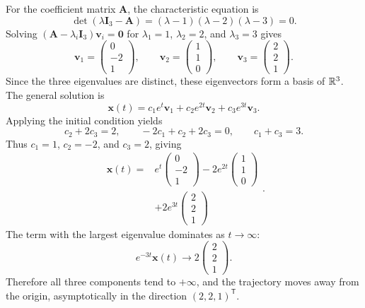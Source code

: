 \documentclass[11pt,oneside]{article}
\begin{document}
\begin{solution}
For the coefficient matrix $\mathbf{A}$, the characteristic equation is
\[
    \det(\lambda\mathbf{I}_3-\mathbf{A})
    =(\lambda-1)(\lambda-2)(\lambda-3)=0.
\]
Solving $(\mathbf{A}-\lambda_i\mathbf{I}_3)\mathbf{v}_i=\mathbf{0}$ for $\lambda_1=1$, $\lambda_2=2$, and $\lambda_3=3$ gives
\[
    \mathbf{v}_1=\begin{pmatrix}0\\-2\\1\end{pmatrix},
    \qquad
    \mathbf{v}_2=\begin{pmatrix}1\\1\\0\end{pmatrix},
    \qquad
    \mathbf{v}_3=\begin{pmatrix}2\\2\\1\end{pmatrix}.
\]
Since the three eigenvalues are distinct, these eigenvectors form a basis of $\mathbb{R}^3$. The general solution is
\[
    \mathbf{x}(t)
    =c_1e^t\mathbf{v}_1+c_2e^{2t}\mathbf{v}_2+c_3e^{3t}\mathbf{v}_3.
\]
Applying the initial condition yields
\[
    c_2+2c_3=2,
    \qquad
    -2c_1+c_2+2c_3=0,
    \qquad
    c_1+c_3=3.
\]
Thus $c_1=1$, $c_2=-2$, and $c_3=2$, giving
\[
    \boxed{
    \begin{aligned}
        \mathbf{x}(t)
        ={}&e^t\begin{pmatrix}0\\-2\\1\end{pmatrix}
            -2e^{2t}\begin{pmatrix}1\\1\\0\end{pmatrix}\\
           &+2e^{3t}\begin{pmatrix}2\\2\\1\end{pmatrix}
    \end{aligned}
    }.
\]
The term with the largest eigenvalue dominates as $t\to\infty$:
\[
    e^{-3t}\mathbf{x}(t)\longrightarrow
    2\begin{pmatrix}2\\2\\1\end{pmatrix}.
\]
Therefore all three components tend to $+\infty$, and the trajectory moves away from the origin, asymptotically in the direction $(2,2,1)^{\mathsf T}$.
\end{solution}
\end{document}
